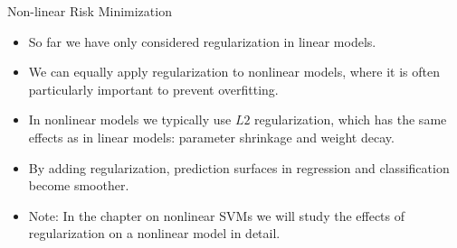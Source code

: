 \begin{vbframe}{Non-linear Risk Minimization}

\begin{itemize}
  \item So far we have only considered regularization in linear models.
  \item We can equally apply regularization to nonlinear models, where it is 
  often particularly important to prevent overfitting.
  \item In nonlinear models we typically use $L2$ regularization, which has the 
  same effects as in linear models: parameter shrinkage and weight decay.
  \item By adding regularization, prediction surfaces in regression and 
  classification become smoother. 
  \item Note: In the chapter on nonlinear SVMs we will study the effects of
  regularization on a nonlinear model in detail. 
\end{itemize}

\end{vbframe}


